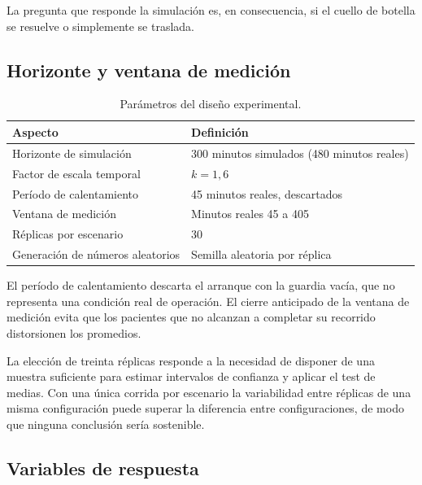 La pregunta que responde la simulación es, en consecuencia, si el cuello de
botella se resuelve o simplemente se traslada.

\subsection{Horizonte y ventana de medición}

\begin{table}[H]
\centering
\begin{tabular}{ll}
\toprule
\textbf{Aspecto} & \textbf{Definición} \\
\midrule
Horizonte de simulación       & 300 minutos simulados (480 minutos reales) \\
Factor de escala temporal     & $k = 1{,}6$ \\
Período de calentamiento      & 45 minutos reales, descartados \\
Ventana de medición           & Minutos reales 45 a 405 \\
Réplicas por escenario        & 30 \\
Generación de números aleatorios & Semilla aleatoria por réplica \\
\bottomrule
\end{tabular}
\caption{Parámetros del diseño experimental.}
\end{table}

El período de calentamiento descarta el arranque con la guardia vacía, que no
representa una condición real de operación. El cierre anticipado de la
ventana de medición evita que los pacientes que no alcanzan a completar su
recorrido distorsionen los promedios.

La elección de treinta réplicas responde a la necesidad de disponer de una
muestra suficiente para estimar intervalos de confianza y aplicar el test de
medias. Con una única corrida por escenario la variabilidad entre réplicas
de una misma configuración puede superar la diferencia entre configuraciones,
de modo que ninguna conclusión sería sostenible.

\subsection{Variables de respuesta}

